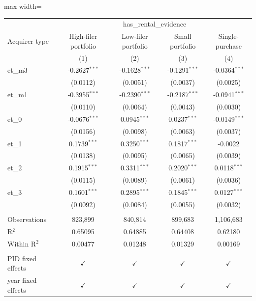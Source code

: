 \documentclass[
  11pt,
]{article}
\begin{document}
\scriptsize
\begin{adjustbox}{max width=\textwidth}

\begingroup
\centering
\begin{tabular}{lcccc}
   \toprule
    & \multicolumn{4}{c}{has\_rental\_evidence}\\
   Acquirer type      & High-filer portfolio & Low-filer portfolio & Small portfolio & Single-purchase \\   
                      & (1)                  & (2)                 & (3)             & (4)\\  
   \midrule 
   et\_m3             & -0.2627$^{***}$      & -0.1628$^{***}$     & -0.1291$^{***}$ & -0.0364$^{***}$\\   
                      & (0.0112)             & (0.0051)            & (0.0037)        & (0.0025)\\   
   et\_m1             & -0.3955$^{***}$      & -0.2390$^{***}$     & -0.2187$^{***}$ & -0.0941$^{***}$\\   
                      & (0.0110)             & (0.0064)            & (0.0043)        & (0.0030)\\   
   et\_0              & -0.0676$^{***}$      & 0.0945$^{***}$      & 0.0237$^{***}$  & -0.0149$^{***}$\\   
                      & (0.0156)             & (0.0098)            & (0.0063)        & (0.0037)\\   
   et\_1              & 0.1739$^{***}$       & 0.3250$^{***}$      & 0.1817$^{***}$  & -0.0022\\   
                      & (0.0138)             & (0.0095)            & (0.0065)        & (0.0039)\\   
   et\_2              & 0.1915$^{***}$       & 0.3311$^{***}$      & 0.2020$^{***}$  & 0.0118$^{***}$\\   
                      & (0.0115)             & (0.0089)            & (0.0061)        & (0.0036)\\   
   et\_3              & 0.1601$^{***}$       & 0.2895$^{***}$      & 0.1845$^{***}$  & 0.0127$^{***}$\\   
                      & (0.0092)             & (0.0084)            & (0.0055)        & (0.0032)\\   
    \\
   Observations       & 823,899              & 840,814             & 899,683         & 1,106,683\\  
   R$^2$              & 0.65095              & 0.64885             & 0.64408         & 0.62180\\  
   Within R$^2$       & 0.00477              & 0.01248             & 0.01329         & 0.00169\\  
    \\
   PID fixed effects  & $\checkmark$         & $\checkmark$        & $\checkmark$    & $\checkmark$\\   
   year fixed effects & $\checkmark$         & $\checkmark$        & $\checkmark$    & $\checkmark$\\   
   \bottomrule
\end{tabular}
\par\endgroup




\end{adjustbox}
\end{document}
